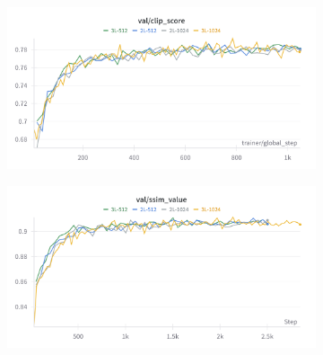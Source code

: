 \begin{figure}[htbp]
  \centering
  \begin{subfigure}[b]{0.48\textwidth}
    \centering
    \includegraphics[width=\textwidth]{images/experiments/cam_depth/clip.png}
    \label{fig:exp_cam_depth_clip}
  \end{subfigure}
  \hfill
  \begin{subfigure}[b]{0.48\textwidth}
    \centering
    \includegraphics[width=\textwidth]{images/experiments/cam_depth/ssim.png}
    \label{fig:exp_cam_depth_ssim}
  \end{subfigure}
  

\end{figure}
